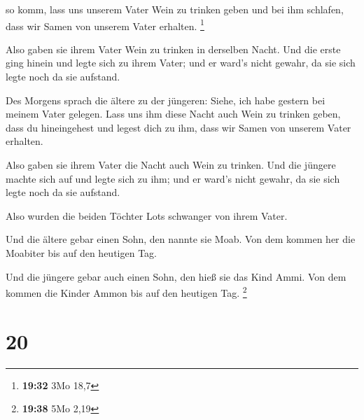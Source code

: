  so komm, lass uns unserem Vater Wein zu trinken geben und
bei ihm schlafen, dass wir Samen von unserem Vater erhalten. \footnote{\textbf{19:32}
  3Mo 18,7}

 Also gaben sie ihrem Vater Wein zu trinken in derselben
Nacht. Und die erste ging hinein und legte sich zu ihrem Vater; und er
ward's nicht gewahr, da sie sich legte noch da sie aufstand.

 Des Morgens sprach die ältere zu der jüngeren: Siehe, ich
habe gestern bei meinem Vater gelegen. Lass uns ihm diese Nacht auch
Wein zu trinken geben, dass du hineingehest und legest dich zu ihm, dass
wir Samen von unserem Vater erhalten.

 Also gaben sie ihrem Vater die Nacht auch Wein zu trinken.
Und die jüngere machte sich auf und legte sich zu ihm; und er ward's
nicht gewahr, da sie sich legte noch da sie aufstand.

 Also wurden die beiden Töchter Lots schwanger von ihrem
Vater.

 Und die ältere gebar einen Sohn, den nannte sie Moab. Von
dem kommen her die Moabiter bis auf den heutigen Tag.

 Und die jüngere gebar auch einen Sohn, den hieß sie das
Kind Ammi. Von dem kommen die Kinder Ammon bis auf den heutigen Tag.
\footnote{\textbf{19:38} 5Mo 2,19}

\hypertarget{section-4}{%
\section{20}\label{section-4}}

